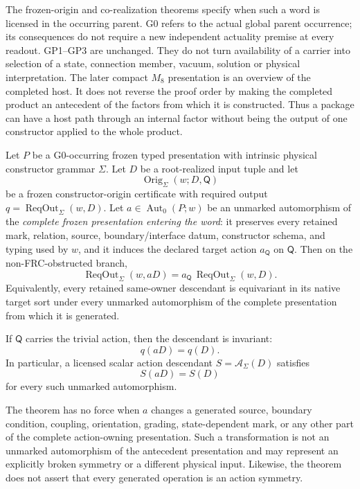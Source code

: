 \documentclass[12pt,a4paper]{article}
\begin{document}
The frozen-origin and co-realization theorems specify when such a
word is licensed in the occurring parent.  G0 refers to the actual
global parent occurrence; its consequences do not require a new
independent actuality premise at every readout.  GP1--GP3 are unchanged.
They do not turn availability of a carrier into selection of a state,
connection member, vacuum, solution or physical interpretation.
The later compact \(M_8\) presentation is an overview of the completed
host.  It does not reverse the proof order by making the completed
product an antecedent of the factors from which it is constructed.
Thus a package can have a host path through an internal factor without
being the output of one constructor applied to the whole product.



\begin{theorem}
\label{p2a:thm:v368-same-owner-unmarked-equivariance}
Let \(P\) be a G0-occurring frozen typed presentation with intrinsic physical
constructor grammar \(\Sigma\).  Let \(D\) be a root-realized input tuple and
let
\[
  \operatorname{Orig}_{\Sigma}(w;D,\mathsf Q)
\]
be a frozen constructor-origin certificate with required output
\(q=\operatorname{ReqOut}_{\Sigma}(w,D)\).  Let
\(a\in\operatorname{Aut}_0(P;w)\) be an unmarked automorphism of the
\emph{complete frozen presentation entering the word}: it preserves every
retained mark, relation, source, boundary/interface datum, constructor schema,
and typing used by \(w\), and it induces the declared target action
\(a_{\mathsf Q}\) on \(\mathsf Q\).  Then on the non-FRC-obstructed branch,
\[
 \boxed{
 \operatorname{ReqOut}_{\Sigma}(w,aD)
 =a_{\mathsf Q}\,
  \operatorname{ReqOut}_{\Sigma}(w,D).}
 \tag{SO-EQ}
\]
Equivalently, every retained same-owner descendant is equivariant in its
native target sort under every unmarked automorphism of the complete
presentation from which it is generated.

If \(\mathsf Q\) carries the trivial action, then the descendant is invariant:
\[
 \boxed{q(aD)=q(D).}
 \tag{SO-INV}
\]
In particular, a licensed scalar action descendant
\(S=\mathscr A_{\Sigma}(D)\) satisfies
\[
 \boxed{S(aD)=S(D)}
 \tag{ACT-INV}
\]
for every such unmarked automorphism.

The theorem has no force when \(a\) changes a generated source, boundary
condition, coupling, orientation, grading, state-dependent mark, or any other
part of the complete action-owning presentation.  Such a transformation is
not an unmarked automorphism of the antecedent presentation and may represent
an explicitly broken symmetry or a different physical input.  Likewise, the
theorem does not assert that every generated operation is an action symmetry.
\end{theorem}
\end{document}

